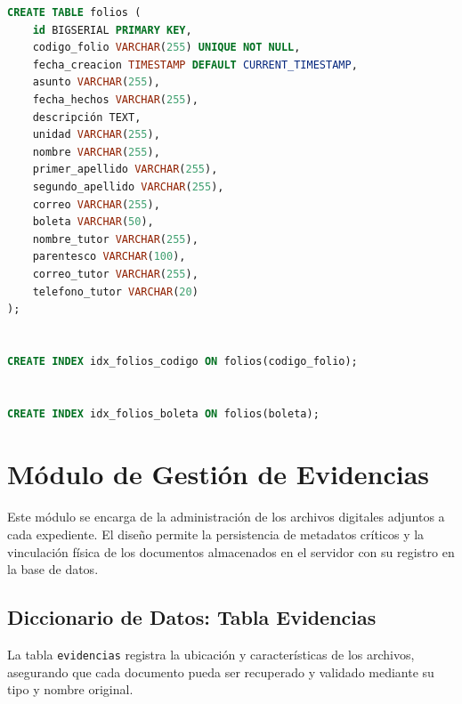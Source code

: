 \begin{lstlisting}[language=SQL, caption={Script DDL para la tabla maestra de folios.}, label={lst:sql_folios}]
CREATE TABLE folios (
    id BIGSERIAL PRIMARY KEY,
    codigo_folio VARCHAR(255) UNIQUE NOT NULL,
    fecha_creacion TIMESTAMP DEFAULT CURRENT_TIMESTAMP,
    asunto VARCHAR(255),
    fecha_hechos VARCHAR(255),
    descripción TEXT,
    unidad VARCHAR(255),
    nombre VARCHAR(255),
    primer_apellido VARCHAR(255),
    segundo_apellido VARCHAR(255),
    correo VARCHAR(255),
    boleta VARCHAR(50),
    nombre_tutor VARCHAR(255),
    parentesco VARCHAR(100),
    correo_tutor VARCHAR(255),
    telefono_tutor VARCHAR(20)
);


CREATE INDEX idx_folios_codigo ON folios(codigo_folio);


CREATE INDEX idx_folios_boleta ON folios(boleta);
\end{lstlisting}


\section{M\'odulo de Gesti\'on de Evidencias}
Este m\'odulo se encarga de la administraci\'on de los archivos digitales adjuntos a cada expediente. El diseño permite la persistencia de metadatos cr\'iticos y la vinculaci\'on f\'isica de los documentos almacenados en el servidor con su registro en la base de datos.

\subsection{Diccionario de Datos: Tabla Evidencias}
La tabla \texttt{evidencias} registra la ubicaci\'on y caracter\'isticas de los archivos, asegurando que cada documento pueda ser recuperado y validado mediante su tipo y nombre original.

